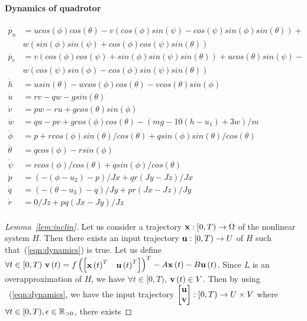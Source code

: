 \begin{appendix}
\paragraph{Dynamics of quadrotor}
%
\begin{align*}
  \dot{p_n} & = u cos(\phi) cos(\theta) - v (cos(\phi)
  sin(\psi)-cos(\psi) sin(\phi) sin(\theta)) + \\ & w (sin(\phi) sin(\psi)+cos(\phi) cos(\psi) sin(\theta))\\
   \dot{p_e} & = v (cos(\phi) cos(\psi)+sin(\phi) sin(\psi)
  sin(\theta)) + u cos(\theta) sin(\psi) - \\ &w (cos(\psi) sin(\phi)-cos(\phi) sin(\psi) sin(\theta))  \\                          
   \dot{h} & = u sin(\theta) - w cos(\phi) cos(\theta)  - v cos(\theta) sin(\phi)\\
   \dot{u} & = r v - q w - g sin(\theta)\\
   \dot{v} & = p w - r u + g cos(\theta) sin(\phi)\\
   \dot{w} & = q u - p v + g cos(\phi) cos(\theta) - (m g - 10 (h - u_1) + 3 w)/m\\
   \dot{\phi} & = p + r cos(\phi) sin(\theta)/cos(\theta) + q sin(\phi) sin(\theta)/cos(\theta)\\
   \dot{\theta} & = q cos(\phi) - r sin(\phi)\\
   \dot{\psi} & = r cos(\phi)/cos(\theta) + q sin(\phi)/cos(\theta)\\
   \dot{p} & = (-(\phi - u_2) - p)/Jx + q r (Jy-Jz)/Jx\\
   \dot{q} & = (-(\theta - u_3) - q)/Jy + p r (Jx-Jz)/Jy\\
   \dot{r} & = 0/Jz + p q (Jx - Jy)/Jz\\
\end{align*}
%
\begin{proof}[Lemma~\ref{lem:inclin}]
Let us consider a trajectory $\mathbf{x}:[0,T)\rightarrow\Omega$ of the
nonlinear system $H$.  Then there exists an input trajectory
$\mathbf{u}:[0,T)\rightarrow U$ of $H$ such that~(\ref{eqn:dynamics}) is
true.  Let us define $\forall t\in[0,T)~\mathbf{v}\left(t\right) =
f\left(\begin{bmatrix}\mathbf{x}\left(t\right)^T & \mathbf{u}\left(t\right)^T\end{bmatrix}\right)^T - A\mathbf{x}\left(t\right) -
B\mathbf{u}\left(t\right)$.  Since $L$ is an overapproximation of $H$, we have
$\forall t\in[0,T)$, $\mathbf{v}\left(t\right)\in V$.  Then by using
~(\ref{eqn:dynamics}, we have the input trajectory
$\begin{bmatrix}\mathbf{u} \\ \mathbf{v}\end{bmatrix}:[0,T)\rightarrow U\times V$ where
$\forall t\in[0,T), \epsilon\in\mathbb{R}_{>0}$, there exists

\end{proof}
\end{appendix}
